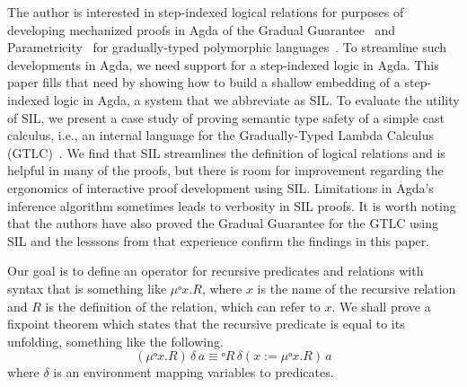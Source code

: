 \documentclass[acmsmall]{acmart}
\newcommand{\app}{\,}
\begin{document}
The author is interested in step-indexed logical relations for
purposes of developing mechanized proofs in Agda of the Gradual
Guarantee~\citep{Siek:2015ac} and Parametricity~\citep{REYNOLDS74C}
for gradually-typed polymorphic
languages~\citep{Ahmed:2011fk,Ahmed:2017aa,Igarashi:2017aa,New:2019ab,Labrada:2020tk}.
To streamline such developments in Agda, we need support for a
step-indexed logic in Agda. This paper fills that need by showing how
to build a shallow embedding of a step-indexed logic in Agda, a system
that we abbreviate as SIL. To evaluate the utility of SIL, we present
a case study of proving semantic type safety of a simple cast
calculus, i.e., an internal language for the Gradually-Typed Lambda
Calculus (GTLC)~\citep{Siek:2006bh,Siek:2007qy}. We find that SIL
streamlines the definition of logical relations and is helpful in many
of the proofs, but there is room for improvement regarding the
ergonomics of interactive proof development using SIL.  Limitations in
Agda's inference algorithm sometimes leads to verbosity in SIL
proofs. It is worth noting that the authors have also proved the
Gradual Guarantee for the GTLC using SIL and the lesssons from that
experience confirm the findings in this paper.



Our goal is to define an operator for recursive predicates and relations
with syntax that is something like $μᵒ x. R$, where $x$ is the name of the
recursive relation and $R$ is the definition of the relation, which
can refer to $x$. We shall prove a fixpoint theorem which states that
the recursive predicate is equal to its unfolding, something like the
following.
\[
  (μᵒ x. R) \app δ \app a ≡ᵒ R \app δ(x:= μᵒ x. R) \app a
\]
where $δ$ is an environment mapping variables to predicates.
\end{document}
